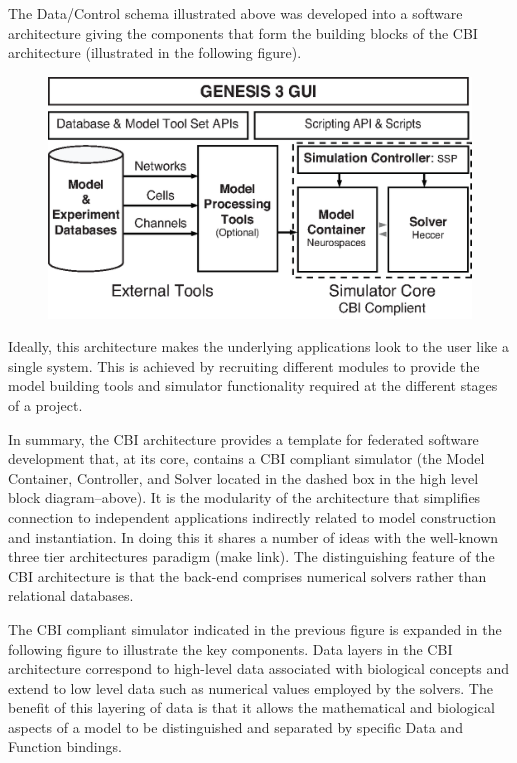\documentclass[12pt]{article}
\begin{document}
The Data/Control schema illustrated above was developed into a software architecture giving the components that form the building blocks of the CBI architecture (illustrated in the following figure).  
\begin{figure}[h]
  \centering
 \includegraphics[scale=0.75]{figures/G3-Architecture-Overview-1.eps}
  \label{fig:architecture1}
\end{figure}
Ideally, this architecture makes the underlying applications look to the user like a single system. This is achieved by recruiting different modules to provide the model building tools and simulator functionality required at the different stages of a project.

In summary, the CBI architecture provides a template for federated software development that, at its core, contains a CBI compliant simulator (the Model Container, Controller, and Solver located in the dashed box in the high level block diagram--above). It is the modularity of the architecture that simplifies connection to independent applications indirectly related to model construction and instantiation. In doing this it shares a number of ideas with the well-known three tier architectures paradigm (make link). The distinguishing feature of the CBI architecture is that the back-end comprises numerical solvers rather than relational databases.

The CBI compliant simulator indicated in the previous figure is expanded in the following figure to illustrate the key components. Data layers in the CBI architecture correspond to high-level data associated with biological concepts and extend to low level data such as numerical values employed by the solvers. The benefit of this layering of data is that it allows the mathematical and biological aspects of a model to be distinguished and separated by specific Data and Function bindings.
\end{document}
